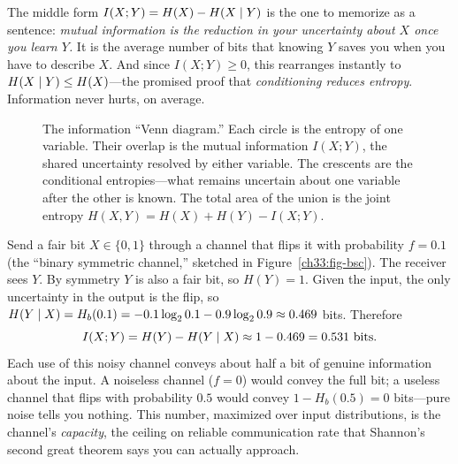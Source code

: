 The middle form $I(X;Y) = H(X) - H(X\mid Y)$ is the one to memorize as a sentence: \emph{mutual
information is the reduction in your uncertainty about $X$ once you learn $Y$.} It is the average number of
bits that knowing $Y$ saves you when you have to describe $X$. And since $I(X;Y) \ge 0$, this rearranges
instantly to $H(X\mid Y) \le H(X)$---the promised proof that \emph{conditioning reduces entropy}.
Information never hurts, on average.

\begin{figure}[H]
\centering
{}
\caption{The information ``Venn diagram.'' Each circle is the entropy of one variable. Their overlap is
the mutual information $I(X;Y)$, the shared uncertainty resolved by either variable. The crescents are the
conditional entropies---what remains uncertain about one variable after the other is known. The total area
of the union is the joint entropy $H(X,Y) = H(X) + H(Y) - I(X;Y)$.}
\label{ch33:fig-venn}
\end{figure}

\begin{example}
\label{ch33:noisy-channel}
Send a fair bit $X \in \{0,1\}$ through a channel that flips it with probability $f = 0.1$ (the ``binary
symmetric channel,'' sketched in Figure~\ref{ch33:fig-bsc}). The receiver sees $Y$. By symmetry $Y$ is
also a fair bit, so $H(Y) = 1$. Given the
input, the only uncertainty in the output is the flip, so $H(Y\mid X) = H_b(0.1) = -0.1\log_2 0.1 -
0.9\log_2 0.9 \approx 0.469$ bits. Therefore
\[
  I(X;Y) = H(Y) - H(Y\mid X) \approx 1 - 0.469 = 0.531 \text{ bits.}
\]
Each use of this noisy channel conveys about half a bit of genuine information about the input. A noiseless
channel ($f=0$) would convey the full bit; a useless channel that flips with probability $0.5$ would
convey $1 - H_b(0.5) = 0$ bits---pure noise tells you nothing. This number, maximized over input
distributions, is the channel's \emph{capacity}, the ceiling on reliable communication rate that Shannon's
second great theorem says you can actually approach.
\end{example}

